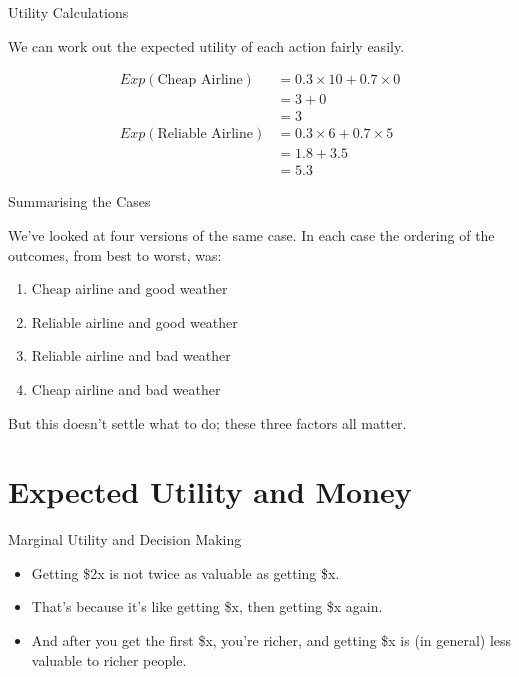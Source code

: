 \documentclass[
  ignorenonframetext,
]{beamer}
\providecommand{\tightlist}{%
  \setlength{\itemsep}{0pt}\setlength{\parskip}{0pt}}
\renewcommand{\,}{\text{, }}
\begin{document}
\begin{frame}{Utility Calculations}
\protect\hypertarget{utility-calculations-2}{}

We can work out the expected utility of each action fairly easily.

\begin{align*}
Exp(\text{Cheap Airline}) &= 0.3 \times 10 + 0.7 \times 0 \\
 &= 3 + 0 \\
 &= 3 \\
Exp(\text{Reliable Airline}) &= 0.3 \times 6 + 0.7 \times 5 \\
 &= 1.8 + 3.5 \\
 &= 5.3 
\end{align*}

\end{frame}

\begin{frame}{Summarising the Cases}
\protect\hypertarget{summarising-the-cases}{}

We've looked at four versions of the same case. In each case the
ordering of the outcomes, from best to worst, was:

\begin{enumerate}
\tightlist
\item
  Cheap airline and good weather
\item
  Reliable airline and good weather
\item
  Reliable airline and bad weather
\item
  Cheap airline and bad weather
\end{enumerate}

But this doesn't settle what to do; these three factors all matter.

\end{frame}

\hypertarget{expected-utility-and-money}{%
\section{Expected Utility and Money}\label{expected-utility-and-money}}

\begin{frame}{Marginal Utility and Decision Making}
\protect\hypertarget{marginal-utility-and-decision-making}{}

\begin{itemize}
\tightlist
\item
  Getting \$2x is not twice as valuable as getting \$x.
\item
  That's because it's like getting \$x, then getting \$x again.
\item
  And after you get the first \$x, you're richer, and getting \$x is (in
  general) less valuable to richer people.
\end{itemize}

\end{frame}
\end{document}
